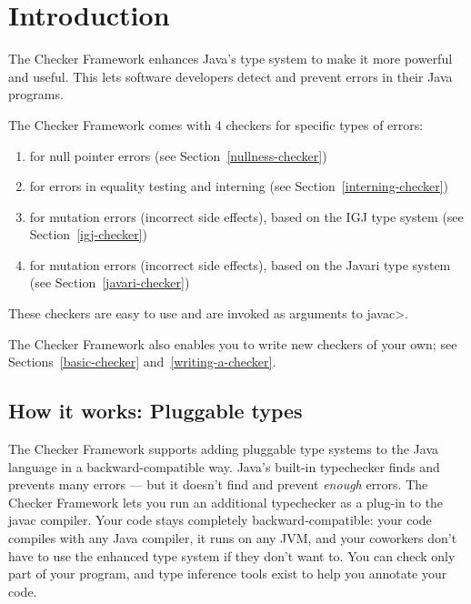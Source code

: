 \section{Introduction\label{introduction}}

The Checker Framework enhances Java's type system to make it more powerful
and useful.
This lets software developers detect and 
prevent errors in their Java programs.

The Checker Framework comes with 4 checkers for specific types of errors:

\begin{enumerate}

\item
   for null pointer errors
  (see Section~\ref{nullness-checker})
\item
   for errors in equality
  testing and interning (see Section~\ref{interning-checker})
\item
   for mutation errors (incorrect
  side effects), based on the IGJ type system (see
  Section~\ref{igj-checker})
\item
   for mutation errors
  (incorrect side effects), based on the Javari type system (see
  Section~\ref{javari-checker})

\end{enumerate}

\noindent
These checkers are easy to use and are invoked as arguments to \<javac>.


The Checker Framework also enables you to write new checkers of your
own; see Sections~\ref{basic-checker} and~\ref{writing-a-checker}.


\subsection{How it works:  Pluggable types}

The Checker Framework supports adding
pluggable type systems to the Java language in a backward-compatible way.
Java's built-in typechecker finds and prevents many errors --- but it
doesn't find and prevent \emph{enough} errors.  The Checker Framework lets you
run an additional typechecker as a plug-in to the javac compiler.  Your
code stays completely backward-compatible:  your code compiles with any
Java compiler, it runs on any JVM, and your coworkers don't have to use the
enhanced type system if they don't want to.  You can check only part of
your program, and type inference tools exist to help you annotate your
code.


